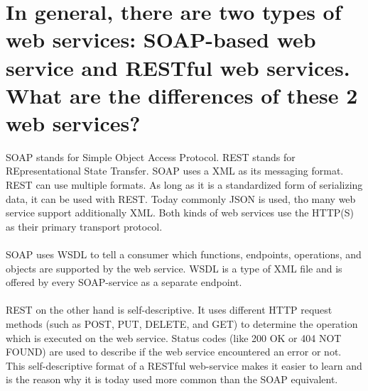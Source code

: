 \documentclass[conference,compsoc,onecolumn]{IEEEtran}
\begin{document}
  \section{In general, there are two types of web services: SOAP-based web service and RESTful web services. What are the differences of these 2 web services?}


    SOAP \cite{soap} stands for Simple Object Access Protocol. REST \cite{rest} stands for REpresentational State Transfer. SOAP uses a XML \cite{xml} as its messaging format. REST can use multiple formats. As long as it is a standardized form of serializing data, it can be used with REST. Today commonly JSON \cite{json} is used, tho many web service support additionally XML. Both kinds of web services use the HTTP(S) \cite{https} as their primary transport protocol.\\
    \\
    SOAP uses WSDL \cite{wsdl11} to tell a consumer which functions, endpoints, operations, and objects are supported by the web service. WSDL is a type of XML file and is offered by every SOAP-service as a separate endpoint.\\
    \\
    REST on the other hand is self-descriptive. It uses different HTTP request methods (such as POST, PUT, DELETE, and GET) to determine the operation which is executed on the web service. Status codes (like 200 OK or 404 NOT FOUND) are used to describe if the web service encountered an error or not. This self-descriptive format of a RESTful web-service makes it easier to learn and is the reason why it is today used more common than the SOAP equivalent.

    
  \printbibliography[heading=bibintoc]  
    
\end{document}
